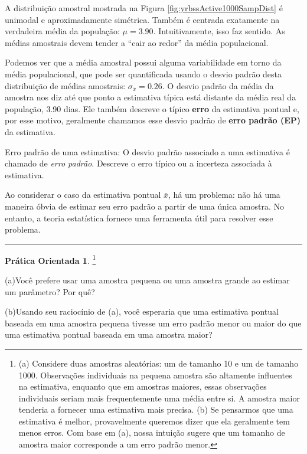 \documentclass[
]{book}
\theoremstyle{definition}
\theoremstyle{definition}
\theoremstyle{definition}
\newtheorem{exercise}{Prática Orientada}[chapter]
\theoremstyle{definition}
\theoremstyle{remark}
\begin{document}
A distribuição amostral mostrada na Figura \ref{fig:yrbssActive1000SampDist} é unimodal e aproximadamente simétrica. Também é centrada exatamente na verdadeira média da população: \(\mu=3.90\). Intuitivamente, isso faz sentido. As médias amostrais devem tender a ``cair ao redor'' da média populacional.

Podemos ver que a média amostral possui alguma variabilidade em torno da média populacional, que pode ser quantificada usando o desvio padrão desta distribuição de médias amostrais: \(\sigma_{\bar{x}} = 0.26\). O desvio padrão da média da amostra nos diz até que ponto a estimativa típica está distante da média real da população, 3.90 dias. Ele também descreve o típico \textbf{erro} da estimativa pontual e, por esse motivo, geralmente chamamos esse desvio padrão de \textbf{erro padrão (EP)} da estimativa.

Erro padrão de uma estimativa: O desvio padrão associado a uma estimativa é chamado de \emph{erro padrão}. Descreve o erro típico ou a incerteza associada à estimativa.

Ao considerar o caso da estimativa pontual \(\bar{x}\), há um problema: não há uma maneira óbvia de estimar seu erro padrão a partir de uma única amostra. No entanto, a teoria estatística fornece uma ferramenta útil para resolver esse problema.

\begin{center}\rule{0.5\linewidth}{0.5pt}\end{center}

\begin{exercise}
\protect\hypertarget{exr:unnamed-chunk-151}{}{\label{exr:unnamed-chunk-151} }\footnote{(a) Considere duas amostras aleatórias: um de tamanho 10 e um de tamanho 1000. Observações individuais na pequena amostra são altamente influentes na estimativa, enquanto que em amostras maiores, essas observações individuais seriam mais frequentemente uma média entre si. A amostra maior tenderia a fornecer uma estimativa mais precisa. (b) Se pensarmos que uma estimativa é melhor, provavelmente queremos dizer que ela geralmente tem menos erros. Com base em (a), nossa intuição sugere que um tamanho de amostra maior corresponde a um erro padrão menor.}

(a)Você prefere usar uma amostra pequena ou uma amostra grande ao estimar um parâmetro? Por quê?

(b)Usando seu raciocínio de (a), você esperaria que uma estimativa pontual baseada em uma amostra pequena tivesse um erro padrão menor ou maior do que uma estimativa pontual baseada em uma amostra maior?
\end{exercise}
\end{document}
